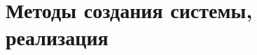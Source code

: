 \chapter{Методы создания системы, реализация}

\let\oldchapter\chapter
\renewcommand{\chapter}[1]{\section{#1}}




\let\chapter\oldchapter
